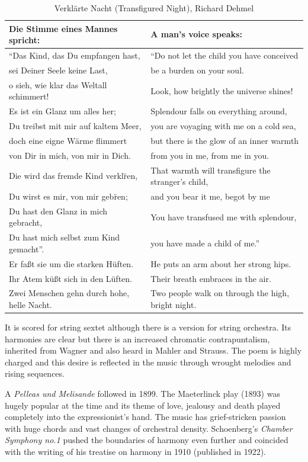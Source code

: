 \begin{table}[h!]
\begin{tabular}{|l|l|}
Die Stimme eines Mannes spricht: & A man’s voice speaks:\\
\hline
``Das Kind, das Du empfangen hast, & ``Do not let the child you have conceived\\
sei Deiner Seele keine Last, & be a burden on your soul.\\
o sieh, wie klar das Weltall schimmert!  & Look, how brightly the universe shines!\\
Es ist ein Glanz um alles her; & Splendour falls on everything around,\\
Du treibst mit mir auf kaltem Meer, & you are voyaging with me on a cold sea,\\
doch eine eigne W\"arme flimmert & but there is the glow of an inner warmth\\
von Dir in mich, von mir in Dich. & from you in me, from me in you.\\
Die wird das fremde Kind verkl\"ren, & That warmth will transfigure the stranger’s child,\\
Du wirst es mir, von mir geb\"ren; & and you bear it me, begot by me\\
Du hast den Glanz in mich gebracht, & You have transfused me with splendour,\\
Du hast mich selbst zum Kind gemacht''. & you have made a child of me.''\\
\hline
Er fa{\ss}t sie um die starken H\"uften. & He puts an arm about her strong hips.\\
Ihr Atem k\"u{\ss}t sich in den L\"uften. & Their breath embraces in the air.\\
Zwei Menschen gehn durch hohe, helle Nacht. & Two people walk on through the high, bright night.\\
\hline
\end{tabular}
\caption{Verkl\"arte Nacht (Transfigured Night), Richard Dehmel}
\label{tab:faune}
\end{table}

It is scored for string sextet although there is a version for string orchestra. Its harmonies are clear but there is an increased chromatic contrapuntalism, inherited from Wagner and also heard in Mahler and Strauss. 
The poem is highly charged and this desire is reflected in the music through wrought melodies and rising sequences. 

A \textit{Pelleas und Melisande} followed in 1899. The Maeterlinck play (1893) was hugely popular at the time and its theme of love, jealousy and death played completely into the expressionist's hand. The music has grief-stricken passion with huge chords and vast changes of orchestral density. Schoenberg's \textit{Chamber Symphony no.1} pushed the boundaries of harmony even further and coincided with the writing of his treatise on harmony in 1910 (published in 1922). 

